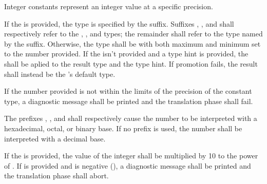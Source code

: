 Integer constants represent an integer value at a specific precision.

\specsubitem
If the  is provided, the type is specified by the
suffix. Suffixes , ,  and  shall
respectively refer to the , , and 
types; the remainder shall refer to the type named by the suffix. Otherwise,
the type shall be  with both maximum and minimum set to the
number provided. If the  isn't provided and a type
hint is provided, the  shall be
aplied to the result type and the type hint. If promotion fails, the result
shall instead be the 's default type.

\specsubitem
If the number provided is not within the limits of the precision of the
constant type, a diagnostic message shall be printed and the translation phase
shall fail.

\specsubitem
The prefixes , , and  shall respectively
cause the number to be interpreted with a hexadecimal, octal, or binary base.
If no prefix is used, the number shall be interpreted with a decimal base.

\specsubitem
If the  is provided, the value of the
integer shall be multiplied by 10 to the power of .
If  is provided and is negative (\terminal{-}), a diagnostic
message shall be printed and the translation phase shall abort.

